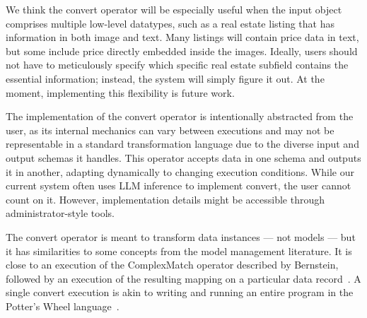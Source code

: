 We think the convert operator will be especially useful when the input object comprises multiple low-level datatypes, such as a real estate listing that has information in both image and text. Many listings will contain price data in text, but some include price directly embedded inside the images.  Ideally, users should not have to meticulously specify which specific real estate subfield contains the essential information; instead, the system will simply figure it out.  At the moment, implementing this flexibility is future work.


The implementation of the convert operator is intentionally abstracted from the user, as its internal mechanics can vary between executions and may not be representable in a standard transformation language due to the diverse input and output schemas it handles. This operator accepts data in one schema and outputs it in another, adapting dynamically to changing execution conditions.  While our current system often uses LLM inference to implement convert, the user cannot count on it. However, implementation details might be accessible through administrator-style tools.

The convert operator is meant to transform
data instances --- not models --- but it has similarities to some concepts from the model management literature. It is close to an execution of the
{\sc ComplexMatch} operator described by Bernstein, followed by an execution of the resulting mapping
on a particular data record~\cite{bernstein03}.  A single  convert execution is akin
to writing and running an entire program in the Potter's Wheel language~\cite{hellerstein}. 


